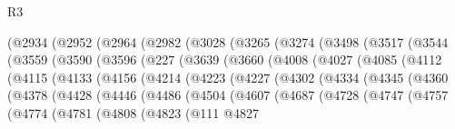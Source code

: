 \begin{lexlean}{R3}
\begin{coremodule}
      (@2934
        (@2952
          (@2964
            (@2982
              (@3028
                (@3265
                  (@3274
                    (@3498
                      (@3517
                        (@3544
                          (@3559
                            (@3590
                              (@3596
                                (@227
                                  (@3639
                                    (@3660
                                      (@4008
                                        (@4027
                                          (@4085
                                            (@4112
                                              (@4115
                                                (@4133
                                                  (@4156
                                                    (@4214
                                                      (@4223
                                                        (@4227
                                                          (@4302
                                                            (@4334
                                                              (@4345
                                                                (@4360
                                                                  (@4378
                                                                    (@4428
                                                                      (@4446
                                                                        (@4486
                                                                          (@4504
                                                                            (@4607
                                                                              (@4687
                                                                                (@4728
                                                                                  (@4747
                                                                                    (@4757
                                                                                      (@4774
                                                                                        (@4781
                                                                                          (@4808
                                                                                            (@4823
                                                                                              (@111
                                                                                                @4827

\end{coremodule}
\end{lexlean}

